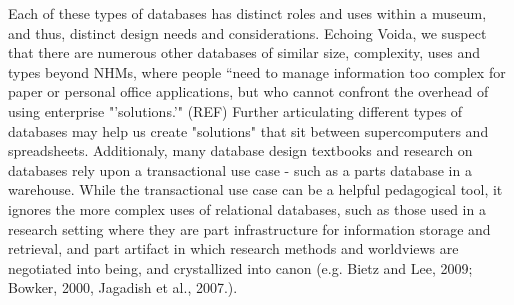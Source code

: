 Each of these types of databases has distinct roles and uses within a museum, and thus, distinct design needs and considerations. Echoing Voida, we suspect that there are numerous other databases of similar size, complexity, uses and types beyond NHMs,  where people “need to manage information too complex for paper or personal office applications, but who cannot confront the overhead of using enterprise "'solutions.'" (REF) Further articulating different types of databases may help us create "solutions" that sit between supercomputers and spreadsheets. Additionaly, many database design textbooks and research on databases rely upon a transactional use case - such as a parts database in a warehouse. While the transactional use case can be a helpful pedagogical tool, it ignores the more complex uses of relational databases, such as those used in a research setting where they are part infrastructure for information storage and retrieval, and part artifact in which research methods and worldviews are negotiated into being, and crystallized into canon (e.g. Bietz and Lee, 2009; Bowker, 2000, Jagadish et al., 2007.). 